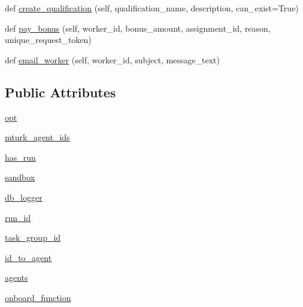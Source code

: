\begin{DoxyCompactItemize}
\item 
def \hyperlink{classmock__turk__manager_1_1MockTurkManager_aa2c8071714fa539d1da018c03703db50}{create\+\_\+qualification} (self, qualification\+\_\+name, description, can\+\_\+exist=True)
\item 
def \hyperlink{classmock__turk__manager_1_1MockTurkManager_a9e702137ceefe881570593bf45cd091d}{pay\+\_\+bonus} (self, worker\+\_\+id, bonus\+\_\+amount, assignment\+\_\+id, reason, unique\+\_\+request\+\_\+token)
\item 
def \hyperlink{classmock__turk__manager_1_1MockTurkManager_ac64f7ad4e2570f5f20a93cd080dc13c4}{email\+\_\+worker} (self, worker\+\_\+id, subject, message\+\_\+text)
\end{DoxyCompactItemize}
\subsection*{Public Attributes}
\begin{DoxyCompactItemize}
\item 
\hyperlink{classmock__turk__manager_1_1MockTurkManager_a90215b4e820f59dd4772d5444a109b78}{opt}
\item 
\hyperlink{classmock__turk__manager_1_1MockTurkManager_a30a18776790f60114b54602b715ed77a}{mturk\+\_\+agent\+\_\+ids}
\item 
\hyperlink{classmock__turk__manager_1_1MockTurkManager_a8cc5a64c1f570db4b9fb075faf761b46}{has\+\_\+run}
\item 
\hyperlink{classmock__turk__manager_1_1MockTurkManager_a378fb06550699871ca3156c1b4b025db}{sandbox}
\item 
\hyperlink{classmock__turk__manager_1_1MockTurkManager_afdf814e9c806fb5ebbaf9d74561e5c05}{db\+\_\+logger}
\item 
\hyperlink{classmock__turk__manager_1_1MockTurkManager_a3a83d86a8a3f1f1bbd7869b24793e3ba}{run\+\_\+id}
\item 
\hyperlink{classmock__turk__manager_1_1MockTurkManager_a785dd09ccdbaa49e62b083a00f84164c}{task\+\_\+group\+\_\+id}
\item 
\hyperlink{classmock__turk__manager_1_1MockTurkManager_af059906f05b261ab7f54b79e4651a5d5}{id\+\_\+to\+\_\+agent}
\item 
\hyperlink{classmock__turk__manager_1_1MockTurkManager_a7657aa553cb22b0eed025bd6ede834ed}{agents}
\item 
\hyperlink{classmock__turk__manager_1_1MockTurkManager_a6e25bcd225d478f6dd719860f0b85499}{onboard\+\_\+function}
\end{DoxyCompactItemize}
